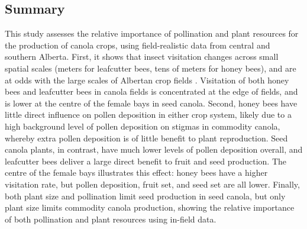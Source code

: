 \documentclass[12pt, draft]{article} %
\begin{document}
\subsection{Summary} %
This study assesses the relative importance of pollination and plant resources for the production of canola crops, using field-realistic data from central and southern Alberta.
First, it shows that insect visitation changes across small spatial scales (meters for leafcutter bees, tens of meters for honey bees), and are at odds with the large scales of Albertan crop fields \citep{fritz2015}.
Visitation of both honey bees and leafcutter bees in canola fields is concentrated at the edge of fields, and is lower at the centre of the female bays in seed canola.	
Second, honey bees have little direct influence on pollen deposition in either crop system, likely due to a high background level of pollen deposition on stigmas in commodity canola, whereby extra pollen deposition is of little benefit to plant reproduction.
Seed canola plants, in contrast, have much lower levels of pollen deposition overall, and leafcutter bees deliver a large direct benefit to fruit and seed production. 
The centre of the female bays illustrates this effect: honey bees have a higher visitation rate, but pollen deposition, fruit set, and seed set are all lower.
Finally, both plant size and pollination limit seed production in seed canola, but only plant size limits commodity canola production, showing the relative importance of both pollination and plant resources using in-field data.
\end{document}
